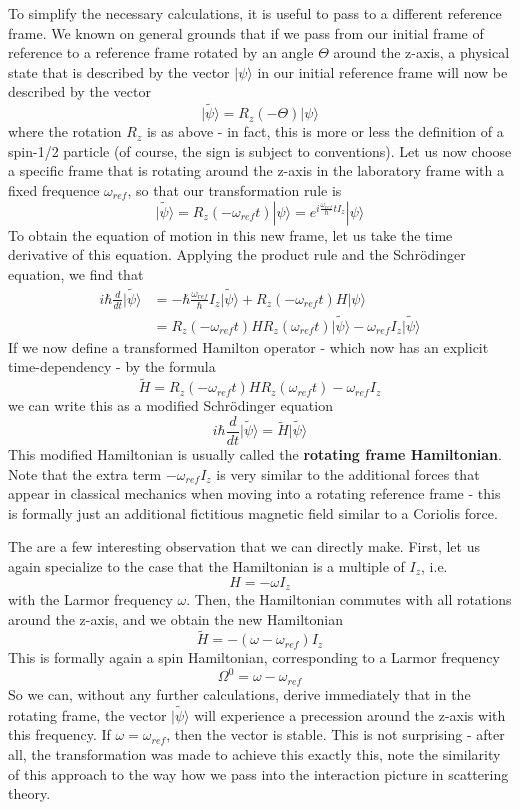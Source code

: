 \documentclass[a4paper, draft]{article}
\theoremstyle{own}
\theoremstyle{remark}
\begin{document}
To simplify the necessary calculations, it is useful to pass to a different reference frame. We known on general grounds that if we pass from our initial frame of reference to a reference frame rotated by an angle $\Theta$ around the z-axis, a physical state that is described by the vector $|\psi \rangle$ in our initial reference frame will now be described by the vector
$$
\widetilde{|\psi\rangle} = R_z(-\Theta) |\psi \rangle
$$ 
where the rotation $R_z$ is as above - in fact, this is more or less the definition of a spin-1/2 particle (of course, the sign is subject to conventions). Let us now choose a specific frame that is rotating around the z-axis in the laboratory frame with a fixed frequence $\omega_{ref}$, so that our transformation rule is
$$
\widetilde{|\psi\rangle} = R_z(-\omega_{ref} t) |\psi \rangle = e^{i\frac{\omega_{ref}}{\hbar}t I_z} |\psi \rangle
$$ 
To obtain the equation of motion in this new frame, let us take the time derivative of this equation. Applying the product rule and the Schr\"odinger equation, we find that
\begin{align*}
i \hbar \frac{d}{dt} \widetilde{|\psi\rangle} &= 
- \hbar \frac{\omega_{ref}}{\hbar} I_z \widetilde{|\psi\rangle} + 
R_z(-\omega_{ref} t) H |\psi \rangle \\
&= R_z(-\omega_{ref}t ) H R_z(\omega_{ref}t ) \widetilde{|\psi\rangle} - \omega_{ref}  I_z  \widetilde{|\psi\rangle}
\end{align*}
If we now define a transformed Hamilton operator - which now has an explicit time-dependency - by the formula
$$
\widetilde{H} = R_z(-\omega_{ref}t ) H R_z(\omega_{ref}t ) - \omega_{ref}  I_z
$$
we can write this as a modified Schr\"odinger equation
$$
i \hbar \frac{d}{dt} \widetilde{|\psi\rangle} = \widetilde{H} \widetilde{|\psi\rangle}
$$
This modified Hamiltonian is usually called the {\bf rotating frame Hamiltonian}. Note that the extra term $ - \omega_{ref}  I_z$ is very similar to the additional forces that appear in classical mechanics when moving into a rotating reference frame - this is formally just an additional fictitious magnetic field similar to a Coriolis force. 

The are a few interesting observation that we can directly make. First, let us again specialize to the case that the Hamiltonian is a multiple of $I_z$, i.e. 
$$
H = -\omega I_z
$$
with the Larmor frequency $\omega$. Then, the Hamiltonian commutes with all rotations around the z-axis, and we obtain the new Hamiltonian
$$
\widetilde{H} = -(\omega - \omega_{ref}) I_z
$$
This is formally again a spin Hamiltonian, corresponding to a Larmor frequency 
$$
\Omega^0 = \omega - \omega_{ref}
$$
So we can, without any further calculations, derive immediately that in the rotating frame, the vector $\widetilde{|\psi\rangle}$ will experience a precession around the z-axis with this frequency. If $\omega = \omega_{ref}$, then the vector is stable. This is not surprising - after all, the transformation was made to achieve this exactly this, note the similarity of this approach to the way how we pass into the interaction picture in scattering theory. 
\end{document}
